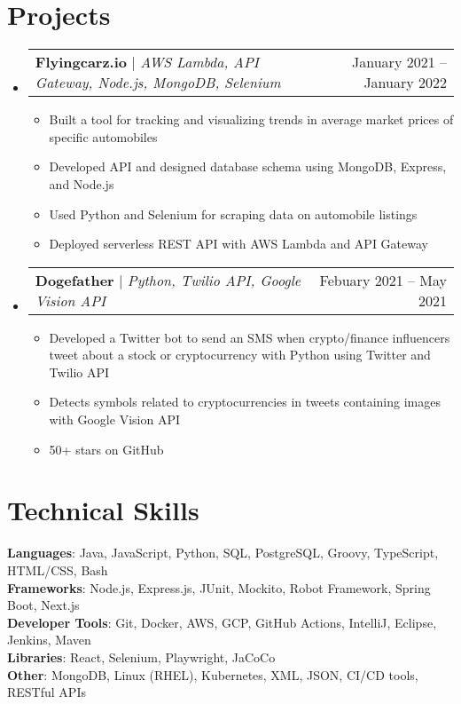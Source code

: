 \documentclass[letterpaper,11pt]{article}
\makeatletter
\newcommand{\resumeItem}[1]{
  \item\small{
    {#1 \vspace{-2pt}}
  }
}
\newcommand{\resumeProjectHeading}[2]{
    \item
    \begin{tabular*}{0.97\textwidth}{l@{\extracolsep{\fill}}r}
      \small#1 & #2 \\
    \end{tabular*}\vspace{-7pt}
}
\newcommand{\resumeSubHeadingListStart}{\begin{itemize}[leftmargin=0.15in, label={}]}
\newcommand{\resumeSubHeadingListEnd}{\end{itemize}}
\newcommand{\resumeItemListStart}{\begin{itemize}}
\newcommand{\resumeItemListEnd}{\end{itemize}\vspace{-5pt}}
\makeatother
\begin{document}
\section{Projects}
    \resumeSubHeadingListStart
      \resumeProjectHeading
          {\textbf{Flyingcarz.io} $|$ \emph{AWS Lambda, API Gateway, Node.js, MongoDB, Selenium}}{January 2021 -- January 2022}
          \resumeItemListStart
            \resumeItem{Built a tool for tracking and visualizing trends in average market prices of specific automobiles}
            \resumeItem{Developed API and designed database schema using MongoDB, Express, and Node.js}
            \resumeItem{Used Python and Selenium for scraping data on automobile listings}
            \resumeItem{Deployed serverless REST API with AWS Lambda and API Gateway}
          \resumeItemListEnd
      \resumeProjectHeading
          {\textbf{Dogefather} $|$ \emph{Python, Twilio API, Google Vision API}}{Febuary 2021 -- May 2021}
          \resumeItemListStart
            \resumeItem{Developed a Twitter bot to send an SMS when crypto/finance influencers tweet about a stock or
            cryptocurrency with Python using Twitter and Twilio API}
            \resumeItem{Detects symbols related to cryptocurrencies in tweets containing images with Google Vision API}
            \resumeItem{50+ stars on GitHub}
          \resumeItemListEnd
    \resumeSubHeadingListEnd



%
\section{Technical Skills}
 \begin{itemize}[leftmargin=0.15in, label={}]
    \small{\item{
     \textbf{Languages}{: Java, JavaScript, Python, SQL, PostgreSQL, Groovy, TypeScript, HTML/CSS, Bash} \\
     \textbf{Frameworks}{: Node.js, Express.js, JUnit, Mockito, Robot Framework, Spring Boot, Next.js} \\
     \textbf{Developer Tools}{: Git, Docker, AWS, GCP, GitHub Actions, IntelliJ, Eclipse, Jenkins, Maven} \\
     \textbf{Libraries}{: React, Selenium, Playwright, JaCoCo} \\
     \textbf{Other}{: MongoDB, Linux (RHEL), Kubernetes, XML, JSON, CI/CD tools, RESTful APIs}
    }}
 \end{itemize}


\end{document}
